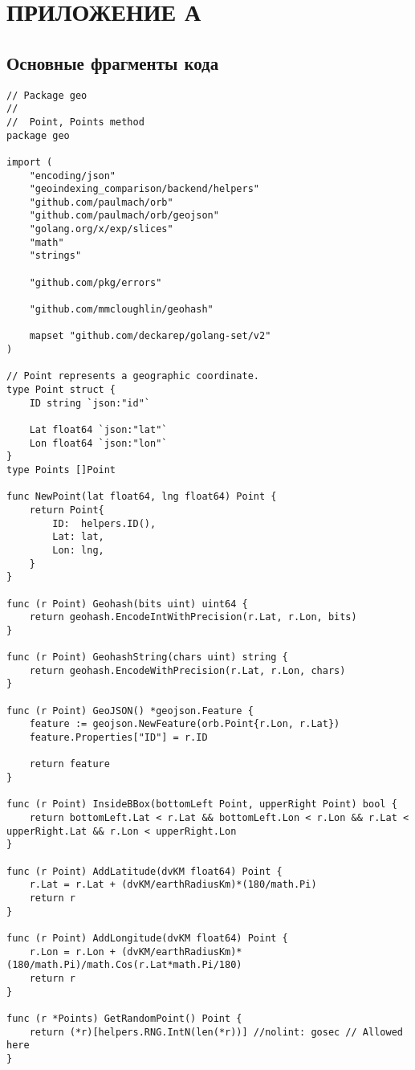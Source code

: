 \chapter{ПРИЛОЖЕНИЕ А}
\section{Основные фрагменты кода}

\begin{lstlisting}[caption=points.go]
// Package geo
//
//	Point, Points method
package geo

import (
	"encoding/json"
	"geoindexing_comparison/backend/helpers"
	"github.com/paulmach/orb"
	"github.com/paulmach/orb/geojson"
	"golang.org/x/exp/slices"
	"math"
	"strings"

	"github.com/pkg/errors"

	"github.com/mmcloughlin/geohash"

	mapset "github.com/deckarep/golang-set/v2"
)

// Point represents a geographic coordinate.
type Point struct {
	ID string `json:"id"`

	Lat float64 `json:"lat"`
	Lon float64 `json:"lon"`
}
type Points []Point

func NewPoint(lat float64, lng float64) Point {
	return Point{
		ID:  helpers.ID(),
		Lat: lat,
		Lon: lng,
	}
}

func (r Point) Geohash(bits uint) uint64 {
	return geohash.EncodeIntWithPrecision(r.Lat, r.Lon, bits)
}

func (r Point) GeohashString(chars uint) string {
	return geohash.EncodeWithPrecision(r.Lat, r.Lon, chars)
}

func (r Point) GeoJSON() *geojson.Feature {
	feature := geojson.NewFeature(orb.Point{r.Lon, r.Lat})
	feature.Properties["ID"] = r.ID

	return feature
}

func (r Point) InsideBBox(bottomLeft Point, upperRight Point) bool {
	return bottomLeft.Lat < r.Lat && bottomLeft.Lon < r.Lon && r.Lat < upperRight.Lat && r.Lon < upperRight.Lon
}

func (r Point) AddLatitude(dvKM float64) Point {
	r.Lat = r.Lat + (dvKM/earthRadiusKm)*(180/math.Pi)
	return r
}

func (r Point) AddLongitude(dvKM float64) Point {
	r.Lon = r.Lon + (dvKM/earthRadiusKm)*(180/math.Pi)/math.Cos(r.Lat*math.Pi/180)
	return r
}

func (r *Points) GetRandomPoint() Point {
	return (*r)[helpers.RNG.IntN(len(*r))] //nolint: gosec // Allowed here
}


\end{lstlisting}
